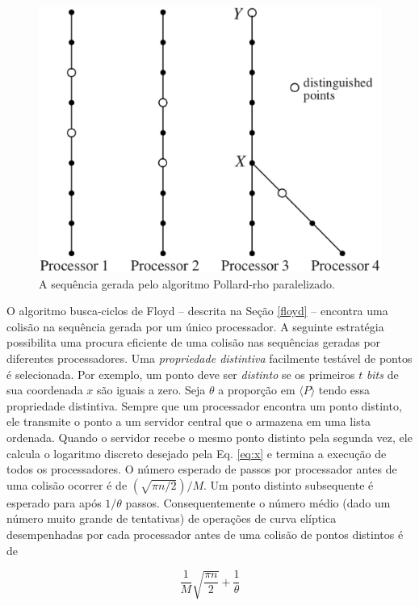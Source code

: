 \begin{figure}[h]
\centering
\includegraphics[scale=0.4, bb=0 0 737 604]{figuras/paralellized.eps}
\caption{A sequência gerada pelo algoritmo Pollard-rho paralelizado. }
\label{fig:paralellized}
\end{figure}

O algoritmo busca-ciclos de Floyd -- descrita na Seção \ref{floyd} -- encontra uma colisão na sequência gerada por um único processador. A seguinte estratégia possibilita uma procura eficiente de uma colisão nas sequências geradas por diferentes processadores. Uma \textit{propriedade distintiva} facilmente testável de pontos é selecionada. Por exemplo, um ponto deve ser \textit{distinto} se os primeiros \(t\) \textit{bits} de sua coordenada \(x\) são iguais a zero. Seja \(\theta\) a proporção em $\langle P \rangle$ tendo essa propriedade distintiva. Sempre que um processador encontra um ponto distinto, ele transmite o ponto a um servidor central que o armazena em uma lista ordenada. Quando o servidor recebe o mesmo ponto distinto pela segunda vez, ele calcula o logaritmo discreto desejado pela Eq. \ref{eq:x} e termina a execução de todos os processadores. O número esperado de passos por processador antes de uma colisão ocorrer é de $(\sqrt{\pi n/2})/M$. Um ponto distinto subsequente é esperado para após $1/\theta$ passos. Consequentemente o número médio (dado um número muito grande de tentativas) de operações de curva elíptica desempenhadas por cada processador antes de uma colisão de pontos distintos é de

\begin{equation}
\dfrac{1}{M} \sqrt{\dfrac{\pi n}{2}} + \dfrac{1}{\theta} \label{eq:execParallelized}
\end{equation}

